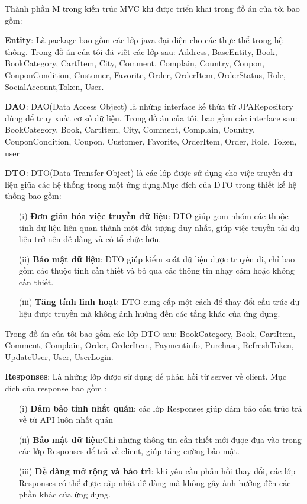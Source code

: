 \documentclass[../DoAn.tex]{subfiles}
\begin{document}
Thành phần M trong kiến trúc MVC khi được triển khai trong đồ án của tôi bao gồm:

\textbf{Entity}: Là package bao gồm các lớp java đại diện cho các thực thể trong hệ thống. Trong đồ án của tôi đã viết các lớp sau: Address, BaseEntity, Book, BookCategory, CartItem, City, Comment, Complain, Country, Coupon, ConponCondition, Customer, Favorite, Order, OrderItem, OrderStatus, Role, SocialAccount,Token, User.

\textbf{DAO}: DAO(Data Access Object) là nhứng interface kế thừa từ JPARepository dùng để truy xuất cơ sỏ dữ liệu. Trong đồ án của tôi, bao gồm các interface sau: BookCategory, Book, CartItem, City, Comment, Complain, Country, CouponCondition, Coupon, Customer, Favorite, OrderItem, Order, Role, Token, user

\textbf{DTO}: DTO(Data Transfer Object) là các lớp được sử dụng cho việc truyền dữ liệu giữa các hệ thống trong một ứng dụng.Mục đích của DTO trong thiết kế hệ thống bao gồm:


\begin{enumerate}
  \item[(i)] \textbf{Đơn giản hóa việc truyền dữ liệu}: DTO giúp gom nhóm các thuộc tính dữ liệu liên quan thành một đối tượng duy nhất, giúp việc truyền tải dữ liệu trở nên dễ dàng và có tổ chức hơn.
  \item[(ii)] \textbf{Bảo mật dữ liệu}: DTO giúp kiểm soát dữ liệu được truyền đi, chỉ bao gồm các thuộc tính cần thiết và bỏ qua các thông tin nhạy cảm hoặc không cần thiết.
  \item[(iii)] \textbf{Tăng tính linh hoạt}: DTO cung cấp một cách để thay đổi cấu trúc dữ liệu được truyền mà không ảnh hưởng đến các tầng khác của ứng dụng.
\end{enumerate}

Trong đồ án của tôi bao gồm các lớp DTO sau: BookCategory, Book, CartItem, Comment, Complain, Order, OrderItem, Paymentinfo, Purchase, RefreshToken, UpdateUser, User, UserLogin.

\textbf{Responses}: Là nhứng lớp được sử dụng để phản hồi từ server về client. Mục đích của response bao gồm :
\begin{enumerate}
  \item[(i)] \textbf{Đảm bảo tính nhất quán}: các lớp  Responses giúp đảm bảo cấu trúc trả về từ API luôn nhất quán
  \item[(ii)] \textbf{Bảo mật dữ liệu}:Chỉ những thông tin cần thiết mới được đưa vào trong các lớp Responses để trả về client, giúp tăng cường bảo mật.
  \item[(iii)] \textbf{Dễ dàng mở rộng và bảo trì}: khi yêu cầu phản hồi thay đổi, các lớp Responses có thể được cập nhật dễ dàng mà không gây ảnh hưởng đến các phần khác của ứng dụng.
\end{enumerate}
\end{document}
